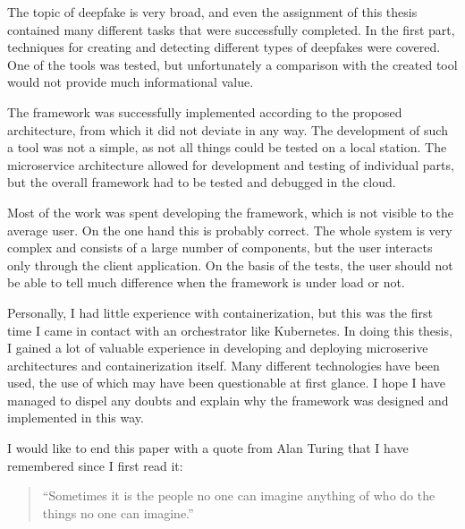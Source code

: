 The topic of deepfake is very broad, and even the assignment of this thesis contained many different tasks that were successfully completed. In the first part, techniques for creating and detecting different types of deepfakes were covered. One of the tools was tested, but unfortunately a comparison with the created tool would not provide much informational value.

The framework was successfully implemented according to the proposed architecture, from which it did not deviate in any way. The development of such a tool was not a simple, as not all things could be tested on a local station. The microservice architecture allowed for development and testing of individual parts, but the overall framework had to be tested and debugged in the cloud.

Most of the work was spent developing the framework, which is not visible to the average user. On the one hand this is probably correct.  The whole system is very complex and consists of a large number of components, but the user interacts only through the client application. On the basis of the tests, the user should not be able to tell much difference when the framework is under load or not.

Personally, I had little experience with containerization, but this was the first time I came in contact with an orchestrator like Kubernetes. In doing this thesis, I gained a lot of valuable experience in developing and deploying microserive architectures and containerization itself. Many different technologies have been used, the use of which may have been questionable at first glance. I hope I have managed to dispel any doubts and explain why the framework was designed and implemented in this way.

I would like to end this paper with a quote from Alan Turing that I have remembered since I first read it:

\begin{quote}
    “Sometimes it is the people no one can imagine anything of who do the things no one can imagine.”
\end{quote}


